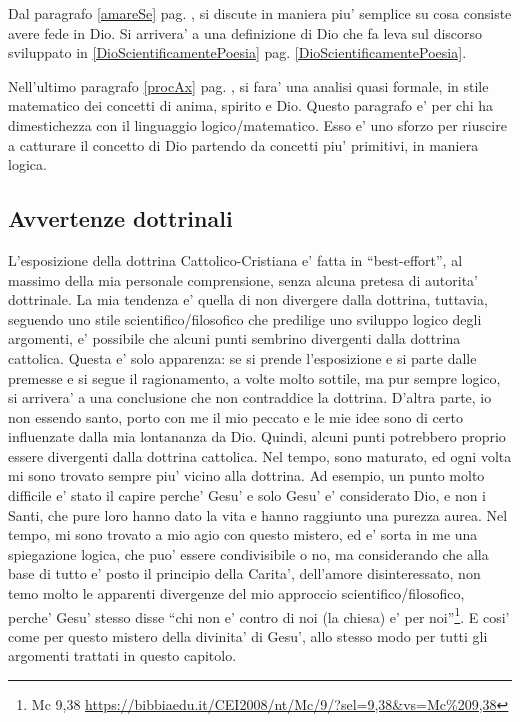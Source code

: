 Dal paragrafo \ref{amareSe} pag. \pageref{amareSe}, si discute in maniera piu' semplice su cosa consiste avere fede in Dio. Si arrivera' a una definizione di Dio che fa leva sul discorso sviluppato in \ref{DioScientificamentePoesia} pag. \ref{DioScientificamentePoesia}.

Nell'ultimo paragrafo \ref{procAx} pag. \pageref{procAx}, si fara' una analisi quasi formale, in stile matematico dei concetti di anima, spirito e Dio. Questo paragrafo e' per chi ha dimestichezza con il linguaggio logico/matematico. Esso e' uno sforzo per riuscire a catturare il concetto di Dio partendo da concetti piu' primitivi, in maniera logica. 

\subsection{Avvertenze dottrinali}
L'esposizione della dottrina Cattolico-Cristiana e' fatta in ``best-effort'', al massimo della mia personale comprensione, senza alcuna pretesa di autorita' dottrinale. La mia tendenza e' quella di non divergere dalla dottrina, tuttavia, seguendo uno stile scientifico/filosofico che predilige uno sviluppo logico degli argomenti, e' possibile che alcuni punti sembrino divergenti dalla dottrina cattolica. Questa e' solo apparenza: se si prende l'esposizione e si parte dalle premesse e si segue il ragionamento, a volte molto sottile, ma pur sempre logico, si arrivera' a una conclusione che non contraddice la dottrina. D'altra parte, io non essendo santo, porto con me il mio peccato e le mie idee sono di certo influenzate dalla mia lontananza da Dio. Quindi, alcuni punti potrebbero proprio essere divergenti dalla dottrina cattolica. Nel tempo, sono maturato, ed ogni volta mi sono trovato sempre piu' vicino alla dottrina. Ad esempio, un punto molto difficile e' stato il capire perche' Gesu' e solo Gesu' e' considerato Dio, e non i Santi, che pure loro hanno dato la vita e hanno raggiunto una purezza aurea. Nel tempo, mi sono trovato a mio agio con questo mistero, ed e' sorta in me una spiegazione logica, che puo' essere condivisibile o no, ma considerando che alla base di tutto e' posto il principio della Carita', dell'amore disinteressato, non temo molto le apparenti divergenze del mio approccio scientifico/filosofico, perche' Gesu' stesso disse ``chi non e' contro di noi (la chiesa) e' per noi''\footnote{Mc 9,38 \url{https://bibbiaedu.it/CEI2008/nt/Mc/9/?sel=9,38\&vs=Mc\%209,38}}. E cosi' come per questo mistero della divinita' di Gesu', allo stesso modo per tutti gli argomenti trattati in questo capitolo.

